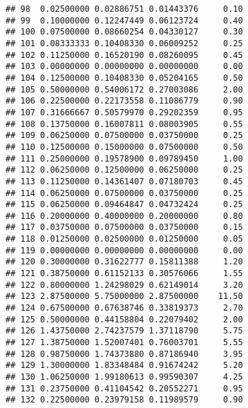 \documentclass[
]{article}
\begin{document}
\begin{verbatim}
## 98  0.02500000 0.02886751 0.01443376     0.10
## 99  0.10000000 0.12247449 0.06123724     0.40
## 100 0.07500000 0.08660254 0.04330127     0.30
## 101 0.08333333 0.10408330 0.06009252     0.25
## 102 0.11250000 0.16520190 0.08260095     0.45
## 103 0.00000000 0.00000000 0.00000000     0.00
## 104 0.12500000 0.10408330 0.05204165     0.50
## 105 0.50000000 0.54006172 0.27003086     2.00
## 106 0.22500000 0.22173558 0.11086779     0.90
## 107 0.31666667 0.50579970 0.29202359     0.95
## 108 0.13750000 0.16007811 0.08003905     0.55
## 109 0.06250000 0.07500000 0.03750000     0.25
## 110 0.12500000 0.15000000 0.07500000     0.50
## 111 0.25000000 0.19578900 0.09789450     1.00
## 112 0.06250000 0.12500000 0.06250000     0.25
## 113 0.11250000 0.14361407 0.07180703     0.45
## 114 0.06250000 0.07500000 0.03750000     0.25
## 115 0.06250000 0.09464847 0.04732424     0.25
## 116 0.20000000 0.40000000 0.20000000     0.80
## 117 0.03750000 0.07500000 0.03750000     0.15
## 118 0.01250000 0.02500000 0.01250000     0.05
## 119 0.00000000 0.00000000 0.00000000     0.00
## 120 0.30000000 0.31622777 0.15811388     1.20
## 121 0.38750000 0.61152133 0.30576066     1.55
## 122 0.80000000 1.24298029 0.62149014     3.20
## 123 2.87500000 5.75000000 2.87500000    11.50
## 124 0.67500000 0.67638746 0.33819373     2.70
## 125 0.50000000 0.44158804 0.22079402     2.00
## 126 1.43750000 2.74237579 1.37118790     5.75
## 127 1.38750000 1.52007401 0.76003701     5.55
## 128 0.98750000 1.74373880 0.87186940     3.95
## 129 1.30000000 1.83348484 0.91674242     5.20
## 130 1.06250000 1.99180613 0.99590307     4.25
## 131 0.23750000 0.41104542 0.20552271     0.95
## 132 0.22500000 0.23979158 0.11989579     0.90
\end{verbatim}
\end{document}
